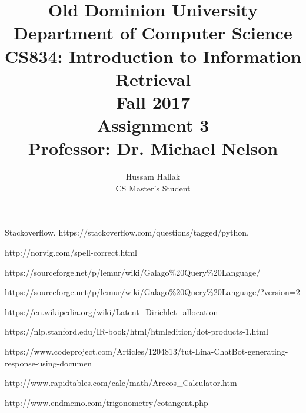 \documentclass[a4paper, 11pt]{article}
\begin{document}
\author{Hussam Hallak\\
CS Master's Student}
\title{Old Dominion University\\
Department of Computer Science\\
CS834: Introduction to Information Retrieval\\
Fall 2017\\ 
Assignment 3\\
Professor: Dr. Michael Nelson}
\maketitle
\newpage











\begin{thebibliography}{9}

\bibitem{} 
Stackoverflow. https://stackoverflow.com/questions/tagged/python.

\bibitem{}
http://norvig.com/spell-correct.html

\bibitem{} 
https://sourceforge.net/p/lemur/wiki/Galago\%20Query\%20Language/

\bibitem{}
https://sourceforge.net/p/lemur/wiki/Galago\%20Query\%20Language/?version=2

\bibitem{}
https://en.wikipedia.org/wiki/Latent\_Dirichlet\_allocation

\bibitem{}
https://nlp.stanford.edu/IR-book/html/htmledition/dot-products-1.html

\bibitem{}
https://www.codeproject.com/Articles/1204813/tut-Lina-ChatBot-generating-response-using-documen

\bibitem{}
http://www.rapidtables.com/calc/math/Arccos\_Calculator.htm

\bibitem{}
http://www.endmemo.com/trigonometry/cotangent.php



\end{thebibliography}
\end{document}
